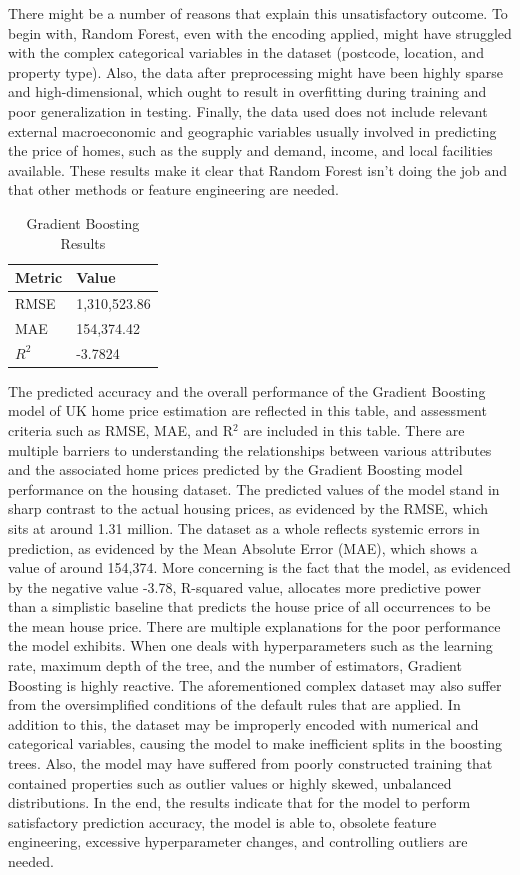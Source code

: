 \documentclass[12pt, a4paper, oneside]{book}
\begin{document}
There might be a number of reasons that explain this unsatisfactory outcome. To begin with, Random Forest, even with the encoding applied, might have struggled with the complex categorical variables in the dataset (postcode, location, and property type). Also, the data after preprocessing might have been highly sparse and high-dimensional, which ought to result in overfitting during training and poor generalization in testing. Finally, the data used does not include relevant external macroeconomic and geographic variables usually involved in predicting the price of homes, such as the supply and demand, income, and local facilities available. These results make it clear that Random Forest isn't doing the job and that other methods or feature engineering are needed.


\begin{table}[htbp]
\centering
\caption{Gradient Boosting Results}
\label{tab:gradient_boosting_results}
\begin{tabular}{|p{4cm}|p{4cm}|}
\hline
\textbf{Metric} & \textbf{Value} \\
\hline
RMSE & 1,310,523.86 \\
\hline
MAE & 154,374.42 \\
\hline
$R^2$ & -3.7824 \\
\hline
\end{tabular}
\end{table}

The predicted accuracy and the overall performance of the Gradient Boosting model of UK home price estimation are reflected in this table, and assessment criteria such as RMSE, MAE, and R$^2$ are included in this table.
There are multiple barriers to understanding the relationships between various attributes and the associated home prices predicted by the Gradient Boosting model performance on the housing dataset. The predicted values of the model stand in sharp contrast to the actual housing prices, as evidenced by the RMSE, which sits at around 1.31 million. The dataset as a whole reflects systemic errors in prediction, as evidenced by the Mean Absolute Error (MAE), which shows a value of around 154,374. More concerning is the fact that the model, as evidenced by the negative value -3.78, R-squared value, allocates more predictive power than a simplistic baseline that predicts the house price of all occurrences to be the mean house price.
There are multiple explanations for the poor performance the model exhibits. When one deals with hyperparameters such as the learning rate, maximum depth of the tree, and the number of estimators, Gradient Boosting is highly reactive. The aforementioned complex dataset may also suffer from the oversimplified conditions of the default rules that are applied. In addition to this, the dataset may be improperly encoded with numerical and categorical variables, causing the model to make inefficient splits in the boosting trees. Also, the model may have suffered from poorly constructed training that contained properties such as outlier values or highly skewed, unbalanced distributions. In the end, the results indicate that for the model to perform satisfactory prediction accuracy, the model is able to, obsolete feature engineering, excessive hyperparameter changes, and controlling outliers are needed.
\end{document}
